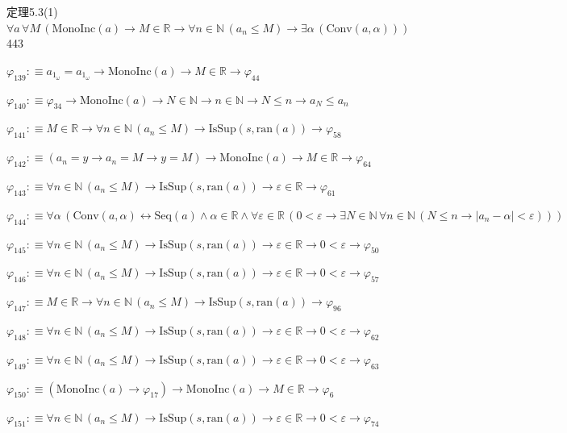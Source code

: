 \begin{fullproof}{定理5.3(1)}{$\forall a\,\forall M\,(\mathrm{MonoInc}(a) \to M \in \mathbb{R} \to \forall n \in \mathbb{N}\,(a_{n} \leq M) \to \exists \alpha\,(\mathrm{Conv}(a,\alpha)))$}{443}
\begin{abbrevlist}
\item $\varphi_{139} :\equiv a_{1_{\omega}} = a_{1_{\omega}} \to \mathrm{MonoInc}(a) \to M \in \mathbb{R} \to \varphi_{44}$
\item $\varphi_{140} :\equiv \varphi_{34} \to \mathrm{MonoInc}(a) \to N \in \mathbb{N} \to n \in \mathbb{N} \to N \leq n \to a_{N} \leq a_{n}$
\item $\varphi_{141} :\equiv M \in \mathbb{R} \to \forall n \in \mathbb{N}\,(a_{n} \leq M) \to \mathrm{IsSup}(s,\mathrm{ran}(a)) \to \varphi_{58}$
\item $\varphi_{142} :\equiv (a_{n} = y \to a_{n} = M \to y = M) \to \mathrm{MonoInc}(a) \to M \in \mathbb{R} \to \varphi_{64}$
\item $\varphi_{143} :\equiv \forall n \in \mathbb{N}\,(a_{n} \leq M) \to \mathrm{IsSup}(s,\mathrm{ran}(a)) \to \varepsilon \in \mathbb{R} \to \varphi_{61}$
\item $\varphi_{144} :\equiv \forall \alpha\,(\mathrm{Conv}(a,\alpha) \leftrightarrow \mathrm{Seq}(a) \land \alpha \in \mathbb{R} \land \forall \varepsilon \in \mathbb{R}\,(0 < \varepsilon \to \exists N \in \mathbb{N}\,\forall n \in \mathbb{N}\,(N \leq n \to \lvert a_{n} - \alpha \rvert < \varepsilon)))$
\item $\varphi_{145} :\equiv \forall n \in \mathbb{N}\,(a_{n} \leq M) \to \mathrm{IsSup}(s,\mathrm{ran}(a)) \to \varepsilon \in \mathbb{R} \to 0 < \varepsilon \to \varphi_{50}$
\item $\varphi_{146} :\equiv \forall n \in \mathbb{N}\,(a_{n} \leq M) \to \mathrm{IsSup}(s,\mathrm{ran}(a)) \to \varepsilon \in \mathbb{R} \to 0 < \varepsilon \to \varphi_{57}$
\item $\varphi_{147} :\equiv M \in \mathbb{R} \to \forall n \in \mathbb{N}\,(a_{n} \leq M) \to \mathrm{IsSup}(s,\mathrm{ran}(a)) \to \varphi_{96}$
\item $\varphi_{148} :\equiv \forall n \in \mathbb{N}\,(a_{n} \leq M) \to \mathrm{IsSup}(s,\mathrm{ran}(a)) \to \varepsilon \in \mathbb{R} \to 0 < \varepsilon \to \varphi_{62}$
\item $\varphi_{149} :\equiv \forall n \in \mathbb{N}\,(a_{n} \leq M) \to \mathrm{IsSup}(s,\mathrm{ran}(a)) \to \varepsilon \in \mathbb{R} \to 0 < \varepsilon \to \varphi_{63}$
\item $\varphi_{150} :\equiv (\mathrm{MonoInc}(a) \to \varphi_{17}) \to \mathrm{MonoInc}(a) \to M \in \mathbb{R} \to \varphi_{6}$
\item $\varphi_{151} :\equiv \forall n \in \mathbb{N}\,(a_{n} \leq M) \to \mathrm{IsSup}(s,\mathrm{ran}(a)) \to \varepsilon \in \mathbb{R} \to 0 < \varepsilon \to \varphi_{74}$

\end{abbrevlist}
\end{fullproof}
